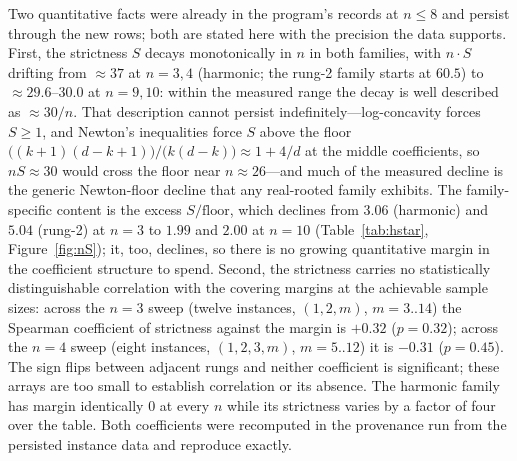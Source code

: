 Two quantitative facts were already in the program's records at $n\le8$
and persist through the new rows; both are stated here with the precision
the data supports. First, the strictness $S$ decays monotonically in $n$
in both families, with $n\cdot S$ drifting from $\approx37$ at
$n=3,4$ (harmonic; the rung-2 family starts at $60.5$) to
$\approx29.6$--$30.0$ at $n=9,10$: within the measured range the decay
is well described as $\approx30/n$. That description cannot persist
indefinitely---log-concavity forces $S\ge1$, and Newton's inequalities
force $S$ above the floor $\bigl((k{+}1)(d{-}k{+}1)\bigr)/\bigl(k(d{-}k)
\bigr)\approx1+4/d$ at the middle coefficients, so $nS\approx30$ would
cross the floor near $n\approx26$---and much of the measured decline is
the generic Newton-floor decline that any real-rooted family exhibits.
The family-specific content is the excess $S/\text{floor}$, which declines
from $3.06$ (harmonic) and $5.04$ (rung-2) at $n=3$ to $1.99$ and
$2.00$ at $n=10$ (Table~\ref{tab:hstar}, Figure~\ref{fig:nS}); it, too,
declines, so there is no growing quantitative margin in the coefficient
structure to spend. Second, the strictness carries no statistically
distinguishable correlation with the covering margins at the achievable
sample sizes: across the $n=3$ sweep (twelve instances, $(1,2,m)$,
$m=3..14$) the Spearman coefficient of strictness against the margin is
$+0.32$ ($p=0.32$); across the $n=4$ sweep (eight instances,
$(1,2,3,m)$, $m=5..12$) it is $-0.31$ ($p=0.45$). The sign flips
between adjacent rungs and neither coefficient is significant; these
arrays are too small to establish correlation or its absence. The
harmonic family has margin identically $0$ at every $n$ while its
strictness varies by a factor of four over the table. Both coefficients
were recomputed in the provenance run from the persisted instance data
and reproduce exactly.

